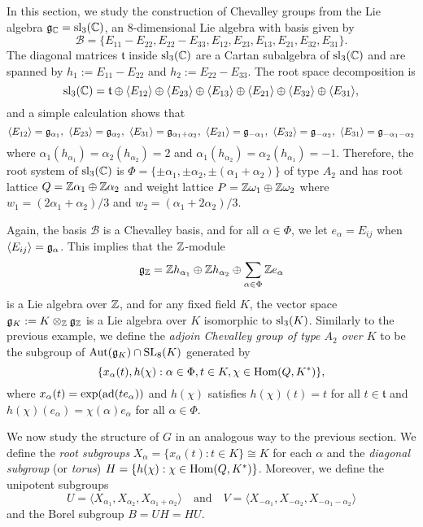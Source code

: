 In this section, we study the construction of Chevalley groups from the Lie algebra $\mathfrak{g}_{\mathbb{C}}=\mathrm{sl}_3(\mathbb{C})$, an $8$-dimensional Lie algebra with basis given by
$$\mathcal{B}=\{E_{11}-E_{22},E_{22}-E_{33},E_{12},E_{23},E_{13},E_{21},E_{32},E_{31}\}.$$
The diagonal matrices $\mathfrak{t}$ inside $\mathrm{sl}_3(\mathbb{C})$ are a Cartan subalgebra of $\mathrm{sl}_3(\mathbb{C})$ and are spanned by $h_1:=E_{11}-E_{22}$ and $h_2:=E_{22}-E_{33}$. The root space decomposition is 
$$\mathrm{sl}_3(\mathbb{C})=\mathfrak{t}\oplus\langle E_{12}\rangle\oplus\langle E_{23}\rangle\oplus\langle E_{13}\rangle\oplus\langle E_{21}\rangle\oplus\langle E_{32}\rangle\oplus\langle E_{31}\rangle,$$
and a simple calculation shows that 
$$\langle E_{12}\rangle=\fg_{\alpha_1},\ \langle E_{23}\rangle=\fg_{\alpha_2},\ \langle E_{31}\rangle=\fg_{\alpha_1+\alpha_2},\ \langle E_{21}\rangle=\fg_{-\alpha_1},\ \langle E_{32}\rangle=\fg_{-\alpha_2},\ \langle E_{31}\rangle=\fg_{-\alpha_1-\alpha_2}$$
where $\alpha_1(h_{\alpha_1})=\alpha_2(h_{\alpha_2})=2$ and $\alpha_1(h_{\alpha_2})=\alpha_2(h_{\alpha_1})=-1$. Therefore, the root system of $\mathrm{sl}_3(\mathbb{C})$ is $\Phi=\{\pm\alpha_1,\pm\alpha_2,\pm(\alpha_1+\alpha_2)\}$ of type $A_2$ and has root lattice $Q=\mathbb{Z}\alpha_1\oplus\mathbb{Z}\alpha_2$ and weight lattice $P=\mathbb{Z}\omega_1\oplus\mathbb{Z}\omega_2$ where $w_1=(2\alpha_1+\alpha_2)/3$ and $w_2=(\alpha_1+2\alpha_2)/3$.

Again, the basis $\mathcal{B}$ is a Chevalley basis, and for all $\alpha\in\Phi$, we let $e_\alpha=E_{ij}$ when $\langle E_{ij}\rangle=\mathfrak{g}_\alpha$. This implies that the $\mathbb{Z}$-module 
$$\mathfrak{g}_{\mathbb{Z}}=\mathbb{Z} h_{\alpha_1}\oplus\mathbb{Z} h_{\alpha_2}\oplus\sum_{\alpha\in\Phi}\mathbb{Z} e_\alpha$$
is a Lie algebra over $\mathbb{Z}$, and for any fixed field $K$, the vector space $\mathfrak{g}_K:=K\otimes_{\mathbb{Z}}\mathfrak{g}_{\mathbb{Z}}$ is a Lie algebra over $K$ isomorphic to $\mathrm{sl}_3(K)$.
Similarly to the previous example, we define the \textit{adjoin Chevalley group of type $A_2$ over $K$} to be the subgroup of $\mathrm{Aut}(\mathfrak{g}_K)\cap\mathrm{SL}_8(K)$ generated by
$$\{x_\alpha(t),h(\chi):\alpha\in\Phi,t\in K,\chi\in\mathrm{Hom}(Q,K^*)\},$$ where $x_\alpha(t)=\exp(\mathrm{ad}(te_\alpha))$ and $h(\chi)$ satisfies $h(\chi)(t)=t$ for all $t\in\mathfrak{t}$ and $h(\chi)(e_\alpha)=\chi(\alpha)e_\alpha$ for all $\alpha\in\Phi$. 

We now study the structure of $G$ in an analogous way to the previous section. We define the \textit{root subgroups} $X_\alpha=\{x_\alpha(t):t\in K\}\cong K$ for each $\alpha$ and the \textit{diagonal subgroup} (or \textit{torus}) $H=\{h(\chi):\chi\in\mathrm{Hom}(Q,K^*)\}$. Moreover, we define the unipotent subgroups 
$$U=\langle X_{\alpha_1},X_{\alpha_2},X_{\alpha_1+\alpha_2}\rangle\quad\text{and}\quad V=\langle X_{-\alpha_1},X_{-\alpha_2},X_{-\alpha_1-\alpha_2}\rangle$$
and the Borel subgroup $B=UH=HU$.


